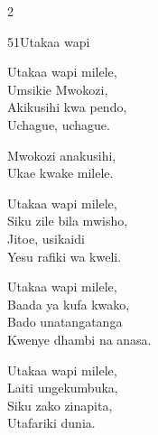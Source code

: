 \begin{multicols}{2}
\begin{hymn}{51}{Utakaa wapi}{}
\begin{stanza}
Utakaa wapi milele,\\
Umsikie Mwokozi,\\
Akikusihi kwa pendo,\\
Uchague, uchague.
\end{stanza}
\begin{chorus}
Mwokozi anakusihi,\\
Ukae kwake milele.
\end{chorus}
\begin{stanza}
Utakaa wapi milele,\\
Siku zile bila mwisho,\\
Jitoe, usikaidi\\
Yesu rafiki wa kweli.
\end{stanza}
\begin{stanza}
Utakaa wapi milele,\\
Baada ya kufa kwako,\\
Bado unatangatanga\\
Kwenye dhambi na anasa.
\end{stanza}
\begin{stanza}
Utakaa wapi milele,\\
Laiti ungekumbuka,\\
Siku zako zinapita,\\
Utafariki dunia.
\end{stanza}
\end{hymn}


\end{multicols}
